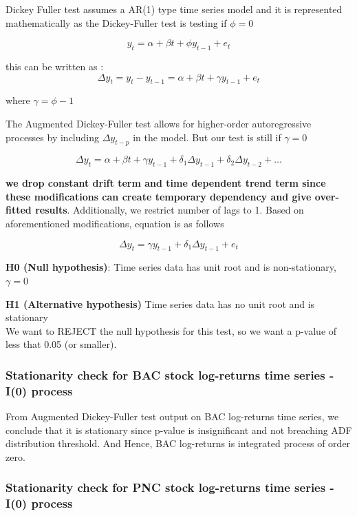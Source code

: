 \documentclass[a4paper, 11pt]{article}
\begin{document}
Dickey Fuller test assumes a AR(1) type time series model and it is represented mathematically as the Dickey-Fuller test is testing if  $\phi = 0$

$$ y_t = \alpha + \beta t + \phi y_{t-1} + e_t $$

this can be written as :
$$\Delta y_t = y_t-y_{t-1}= \alpha + \beta t + \gamma y_{t-1} + e_t $$ 

where $\gamma = \phi -1 $ 

The Augmented Dickey-Fuller test allows for higher-order autoregressive processes by including  $\Delta y_{t-p}$ in the model. But our test is still if $\gamma =0 $
 
$$\Delta y_t = \alpha + \beta t + \gamma y_{t-1} + \delta_1 \Delta y_{t-1} + \delta_2 \Delta y_{t-2} + \dots $$

\textbf{we drop constant drift term and time dependent trend term since these modifications can create temporary
dependency and give over-fitted results}. Additionally, we restrict number of lags to 1. Based on aforementioned modifications, equation is as follows

$$\Delta y_t = \gamma y_{t-1} + \delta_1 \Delta y_{t-1} + e_t$$ 

\textbf{H0 (Null hypothesis)}: Time series data has unit root and is non-stationary, $\gamma = 0$ 

\textbf{H1 (Alternative hypothesis)} Time series data has no unit root and is stationary\\

We want to REJECT the null hypothesis for this test, so we want a p-value of less that 0.05 (or smaller).

\subsubsection{Stationarity check for BAC stock log-returns time series - I(0) process}



From Augmented Dickey-Fuller test output on BAC log-returns time series, we conclude that it is stationary since p-value is insignificant and not breaching ADF distribution threshold. And Hence, BAC log-returns is integrated process of order zero.

\subsubsection{Stationarity check for PNC stock log-returns time series - I(0) process}
\end{document}
